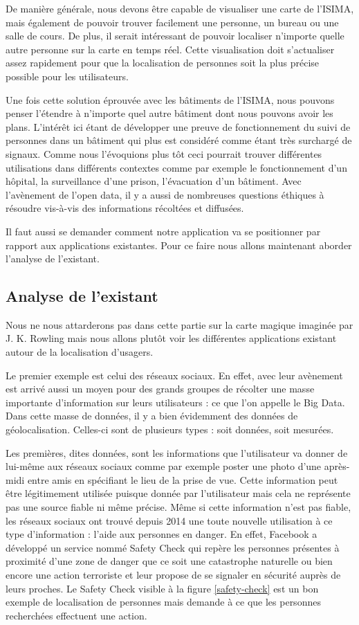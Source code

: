 De manière générale, nous devons être capable de visualiser une carte de l'ISIMA, mais également de pouvoir trouver facilement une personne, un bureau ou une salle de cours. De plus, il serait intéressant de pouvoir localiser n'importe quelle autre personne sur la carte en temps réel. Cette visualisation doit s'actualiser assez rapidement pour que la localisation de personnes soit la plus précise possible pour les utilisateurs.

Une fois cette solution éprouvée avec les bâtiments de l'ISIMA, nous pouvons penser l'étendre à n'importe quel autre bâtiment dont nous pouvons avoir les plans. L’intérêt ici étant de développer une preuve de fonctionnement du suivi de personnes dans un bâtiment qui plus est considéré comme étant très surchargé de signaux. Comme nous l’évoquions plus tôt ceci pourrait trouver différentes utilisations dans différents contextes comme par exemple le fonctionnement d’un hôpital, la surveillance d’une prison, l’évacuation d’un bâtiment. Avec l’avènement de l’open data, il y a aussi de nombreuses questions éthiques à résoudre vis-à-vis des informations récoltées et diffusées.

Il faut aussi se demander comment notre application va se positionner par rapport aux applications existantes. Pour ce faire nous allons maintenant aborder l’analyse de l’existant.


\subsection{Analyse de l'existant}

Nous ne nous attarderons pas dans cette partie sur la carte magique imaginée par J. K. Rowling mais nous allons plutôt voir les différentes applications existant autour de la localisation d’usagers.

Le premier exemple est celui des réseaux sociaux. En effet, avec leur avènement est arrivé aussi un moyen pour des grands groupes de récolter une masse importante d’information sur leurs utilisateurs : ce que l’on appelle le Big Data. Dans cette masse de données, il y a bien évidemment des données de géolocalisation. Celles-ci sont de plusieurs types : soit données, soit mesurées.

Les premières, dites données, sont les informations que l’utilisateur va donner de lui-même aux réseaux sociaux comme par exemple poster une photo d’une après-midi entre amis en spécifiant le lieu de la prise de vue. Cette information peut être légitimement utilisée puisque donnée par l’utilisateur mais cela ne représente pas une source fiable ni même précise. Même si cette information n’est pas fiable, les réseaux sociaux ont trouvé depuis 2014 une toute nouvelle utilisation à ce type d’information : l’aide aux personnes en danger. En effet, Facebook a développé un service nommé Safety Check qui repère les personnes présentes à proximité d’une zone de danger que ce soit une catastrophe naturelle ou bien encore une action terroriste et leur propose de se signaler en sécurité auprès de leurs proches. Le Safety Check visible à la figure \ref{safety-check} est un bon exemple de localisation de personnes mais demande à ce que les personnes recherchées effectuent une action.

